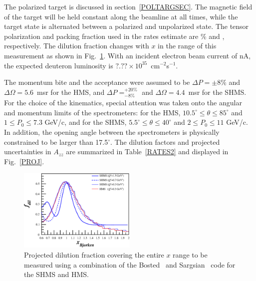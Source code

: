 The polarized \TARGET target is discussed in section~\ref{POLTARGSEC}.  The magnetic field of the target will be held constant along the beamline at all times, while the target state is alternated between a polarized and unpolarized state.
The tensor polarization and packing fraction used in the rates estimate are \PZZ\% and \PF, respectively. 
The dilution fraction changes with $x$ in the range of this measurement as shown in Fig.~\ref{fdil_plot}.
With an incident electron beam current of \CURRENT nA, the expected deuteron luminosity is 
$?.??\times 10^{35}$~cm$^{-2}$s$^{-1}$.

The momentum bite and the acceptance were assumed to be $\Delta P = \pm 8\%$ and $\Delta\Omega = 5.6$~msr for the HMS, and $\Delta P= ^{+20\%}_{-8\%}$ 
and $\Delta\Omega =4.4$~msr for the SHMS. 
%
For the choice of the kinematics,
special attention was taken onto the angular and momentum limits of the spectrometers: for the
HMS, $10.5^{\circ} \le \theta \le 85^{\circ}$ and $1 \le P_0 \le 7.3$ GeV/c, and for the SHMS,
$5.5^{\circ} \le \theta \le 40^{\circ}$ and $2 \le P_0 \le 11$ GeV/c. In addition, the
opening angle between the spectrometers is physically constrained to be larger than 17.5$^{\circ}$.
The dilution factors and projected uncertainties in $A_{zz}$ are summarized in Table~\ref{RATES2} and displayed in Fig.~\ref{PROJ}.  

\begin{figure}
\begin{center}
\includegraphics[width=0.5\textwidth]{figs/Pzz_30_fdil_all.eps} 
\caption{\label{fdil_plot}Projected dilution fraction covering the entire $x$ range to be measured using a combination of the Bosted~\cite{Bosted:2012qc} and Sargsian~\cite{needed} code for the SHMS and HMS.}
\end{center}
\end{figure}


